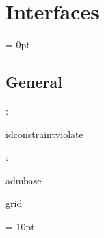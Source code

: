 
\section{Interfaces} 


\parskip = 0pt

\vspace{3mm} \subsection*{General}

: 

idconstraintviolate
\vspace{2mm}

: 

admbase

grid
\vspace{2mm}

\vspace{5mm}\parskip = 10pt 
